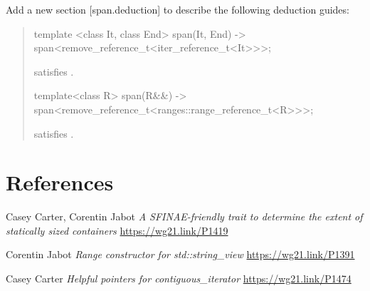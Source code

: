 \documentclass{wg21}
\begin{document}
Add a new section [span.deduction] to describe the following deduction guides:


\begin{quote}
\begin{addedblock}
\begin{itemdecl}
template <class It, class End>
span(It, End) -> span<remove_reference_t<iter_reference_t<It>>>;
\end{itemdecl}
\begin{itemdescr}
    \constraints
     satisfies .
\end{itemdescr}

\begin{itemdecl}
template<class R>
span(R&&) -> span<remove_reference_t<ranges::range_reference_t<R>>>;
\end{itemdecl}
\begin{itemdescr}
    \constraints {} satisfies .
\end{itemdescr}


\end{addedblock}

\end{quote}

\section{References}
\renewcommand{\section}[2]{}%
\begin{thebibliography}{9}

    Casey Carter, Corentin Jabot
    \emph{A SFINAE-friendly trait to determine the extent of statically sized containers}\newline
    \url{https://wg21.link/P1419}

    Corentin Jabot
    \emph{Range constructor for std::string\_view}\newline
    \url{https://wg21.link/P1391}


    Casey Carter
    \emph{Helpful pointers for contiguous_iterator}\newline
    \url{https://wg21.link/P1474}


\end{thebibliography}
\end{document}
